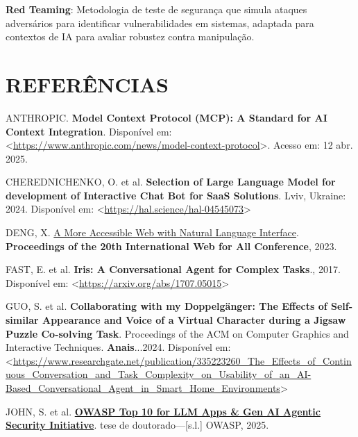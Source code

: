 \documentclass[
]{article}
\newlength{\cslhangindent}
\newenvironment{CSLReferences}[2] %
 {\begin{list}{}{%
  \setlength{\itemindent}{0pt}
  \setlength{\leftmargin}{0pt}
  \setlength{\parsep}{0pt}
  \ifodd #1
   \setlength{\leftmargin}{\cslhangindent}
   \setlength{\itemindent}{-1\cslhangindent}
  \fi
  \setlength{\itemsep}{#2\baselineskip}}}
 {\end{list}}
\begin{document}
\textbf{Red Teaming}: Metodologia de teste de segurança que simula
ataques adversários para identificar vulnerabilidades em sistemas,
adaptada para contextos de IA para avaliar robustez contra manipulação.

\section*{REFERÊNCIAS}\label{referuxeancias}

\label{refs}
\begin{CSLReferences}{0}{1}
ANTHROPIC. \textbf{Model Context Protocol (MCP): A Standard for AI
Context Integration}. Disponível em:
\textless{}\url{https://www.anthropic.com/news/model-context-protocol}\textgreater.
Acesso em: 12 abr. 2025.

CHEREDNICHENKO, O. et al. \textbf{Selection of Large Language Model for
development of Interactive Chat Bot for SaaS Solutions}. Lviv, Ukraine:
2024. Disponível em:
\textless{}\url{https://hal.science/hal-04545073}\textgreater{}

DENG, X. \href{https://api.semanticscholar.org/CorpusID:258259387}{A
More Accessible Web with Natural Language Interface}.
\textbf{Proceedings of the 20th International Web for All Conference},
2023.

FAST, E. et al. \textbf{Iris: A Conversational Agent for Complex
Tasks}., 2017. Disponível em:
\textless{}\url{https://arxiv.org/abs/1707.05015}\textgreater{}

GUO, S. et al. \textbf{Collaborating with my Doppelgänger: The Effects
of Self-similar Appearance and Voice of a Virtual Character during a
Jigsaw Puzzle Co-solving Task}. Proceedings of the ACM on Computer
Graphics and Interactive Techniques. \textbf{Anais}...2024. Disponível
em:
\textless{}\url{https://www.researchgate.net/publication/335223260_The_Effects_of_Continuous_Conversation_and_Task_Complexity_on_Usability_of_an_AI-Based_Conversational_Agent_in_Smart_Home_Environments}\textgreater{}

JOHN, S. et al.
\textbf{\href{https://genai.owasp.org/llmrisk/llm01-prompt-injection}{OWASP
Top 10 for LLM Apps \& Gen AI Agentic Security Initiative}}. tese de
doutorado---{[}s.l.{]} OWASP, 2025.


\end{CSLReferences}
\end{document}
